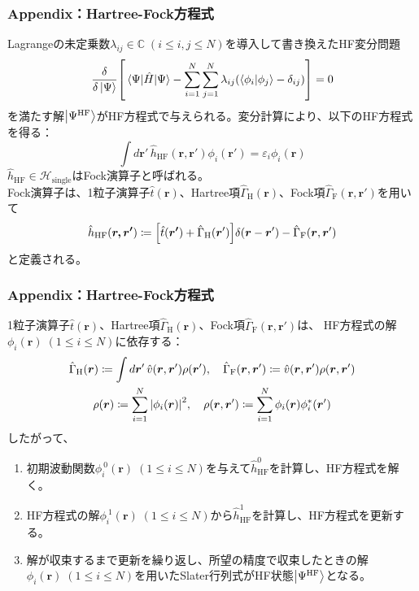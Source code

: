 \documentclass[12pt,aspectratio=169,xcolor=dvipsnames,table,dvipdfmx]{beamer}
\theoremstyle{definition}
\begin{document}
\begin{frame}
  \frametitle{Appendix：Hartree-Fock方程式}
  \small
  Lagrangeの未定乗数$\lambda_{ij}\in\mathbb{C}\;(i\leq i,j\leq N)$を導入して書き換えたHF変分問題
  \begin{equation*}
    \fdv{\ket{\Psi}}\qty[\ev{\hat{H}}{\Psi}-\sum_{i=1}^N\sum_{j=1}^{N}\lambda_{ij}(\braket{\phi_i}{\phi_j}-\delta_{ij})]=0
  \end{equation*}
  を満たす解$\ket{\Psi^{\text{HF}}}$がHF方程式で与えられる。変分計算により、以下のHF方程式を得る：
  \begin{equation*}
    \int d\bm{r}'\,\hat{h}_{\text{HF}}(\bm{r},\bm{r}')\phi_i(\bm{r}')  = \varepsilon_i\phi_i(\bm{r})
  \end{equation*}
  $\hat{h}_{\text{HF}}\in\mathcal{H}_{\text{single}}$はFock演算子と呼ばれる。\\
  Fock演算子は、1粒子演算子$\hat{t}(\bm{r})$、Hartree項$\hat{\Gamma}_{\text{H}}(\bm{r})$、Fock項$\hat{\Gamma}_{\text{F}}(\bm{r},\bm{r}')$を用いて
  \begin{equation*}
    \hat{h}_{\text{HF}}(\bm{r,\bm{r}'})\coloneqq \qty[\hat{t}(\bm{r'})+\hat{\Gamma}_{\text{H}}(\bm{r}')]\delta(\bm{r}-\bm{r}')-\hat{\Gamma}_{\text{F}}(\bm{r},\bm{r}')
  \end{equation*}
  と定義される。
\end{frame}

\begin{frame}
  \frametitle{Appendix：Hartree-Fock方程式}
  \small
  1粒子演算子$\hat{t}(\bm{r})$、Hartree項$\hat{\Gamma}_{\text{H}}(\bm{r})$、Fock項$\hat{\Gamma}_{\text{F}}(\bm{r},\bm{r}')$は、
  HF方程式の解$\phi_i(\bm{r})\;(1\leq i\leq N)$に依存する：
  \begin{gather*}
    \hat{\Gamma}_{\text{H}}(\bm{r})\coloneqq \int d\bm{r}'\,\hat{v}(\bm{r},\bm{r}')\rho(\bm{r}'),\quad\hat{\Gamma}_{\text{F}}(\bm{r},\bm{r}')\coloneqq \hat{v}(\bm{r},\bm{r}')\rho(\bm{r},\bm{r}')      \\
    \rho(\bm{r}) \coloneqq \sum_{i=1}^{N}\abs{\phi_i(\bm{r})}^2 ,\quad\rho(\bm{r},\bm{r}')\coloneqq \sum_{i=1}^{N}\phi_i(\bm{r})\phi_i^{*}(\bm{r}')
  \end{gather*}
  したがって、
  \begin{enumerate}
    \item 初期波動関数$\phi^{~0}_i(\bm{r})\;(1\leq i\leq N)$を与えて$\hat{h}^{0}_{\text{HF}}$を計算し、HF方程式を解く。
    \item HF方程式の解$\phi^{~1}_i(\bm{r})\;(1\leq i\leq N)$から$\hat{h}^{1}_{\text{HF}}$を計算し、HF方程式を更新する。
    \item 解が収束するまで更新を繰り返し、所望の精度で収束したときの解$\phi_i(\bm{r})\;(1\leq i\leq N)$を用いたSlater行列式がHF状態$\ket{\Psi^{\text{HF}}}$となる。
  \end{enumerate}
\end{frame}
\end{document}
